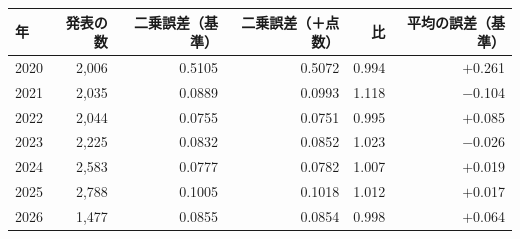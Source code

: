 \begin{tabular}{@{}lrrrrr@{}}
\toprule
年 & 発表の数 & 二乗誤差（基準） & 二乗誤差（＋点数） & 比 & 平均の誤差（基準） \\
\midrule
2020 & 2,006 & 0.5105 & 0.5072 & 0.994 & $+$0.261 \\
2021 & 2,035 & 0.0889 & 0.0993 & 1.118 & $-$0.104 \\
2022 & 2,044 & 0.0755 & 0.0751 & 0.995 & $+$0.085 \\
2023 & 2,225 & 0.0832 & 0.0852 & 1.023 & $-$0.026 \\
2024 & 2,583 & 0.0777 & 0.0782 & 1.007 & $+$0.019 \\
2025 & 2,788 & 0.1005 & 0.1018 & 1.012 & $+$0.017 \\
2026 & 1,477 & 0.0855 & 0.0854 & 0.998 & $+$0.064 \\
\bottomrule
\end{tabular}
